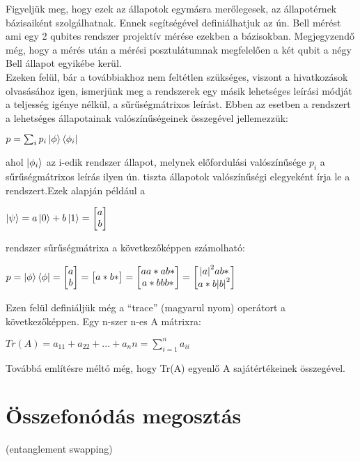 Figyeljük meg, hogy ezek az állapotok egymásra merőlegesek, az állapotérnek bázisaiként szolgálhatnak. Ennek segítségével definiálhatjuk az ún. Bell mérést ami egy 2 qubites rendszer projektív mérése ezekben a bázisokban. Megjegyzendő még, hogy a mérés után a mérési posztulátumnak megfelelően a két qubit a négy Bell állapot egyikébe kerül.\\
Ezeken felül, bár a továbbiakhoz nem feltétlen szükséges, viszont a hivatkozások olvasásához igen, ismerjünk meg a rendszerek egy másik lehetséges leírási módját a teljesség igénye nélkül, a sűrűségmátrixos leírást\cite{kvantkonyv2}. Ebben az esetben a rendszert a lehetséges állapotainak valószínűségeinek összegével jellemezzük:
\begin{center}
$ p=\sum_i p_i \ket{\phi}\bra{\phi_i} $
\end{center}
ahol $ \ket{\phi_i} $ az i-edik rendszer állapot, melynek előfordulási valószínűsége $ p_i $ a sűrűségmátrixos leírás ilyen ún. tiszta állapotok valószínűségi elegyeként írja le a rendszert.Ezek alapján például a 
\begin{center}
$ \ket{\psi}=a\ket{0}+b\ket{1}= \begin{bmatrix} a\\b \end{bmatrix} $
\end{center}
rendszer sűrűségmátrixa a következőképpen számolható:
\begin{center}
$ p= \ket{\phi}\bra{\phi} = \begin{bmatrix} a \\ b \end{bmatrix} = \begin{bmatrix} a* b* \end{bmatrix}= \begin{bmatrix} aa* ab*\\a*b bb* \end{bmatrix} = \begin{bmatrix} \abs{a}^2 ab* \\ a*b \abs{b}^2 \end{bmatrix} $
\end{center}
Ezen felül definiáljük még a “trace” (magyarul nyom) operátort a következőképpen. Egy n-szer n-es A mátrixra:
\begin{center}
$ Tr(A) = a_{11}+a_{22}+... +a_nn= \sum_{i=1}^n a_{ii} $
\end{center}
Továbbá említésre méltó még, hogy Tr(A) egyenlő A sajátértékeinek összegével.

\section{Összefonódás megosztás}
(entanglement swapping)
